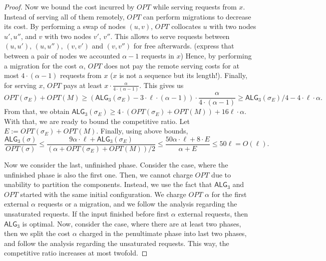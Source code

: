 \documentclass[manuscript,screen=true]{acmart}
\newcommand{\OPT}{\mathit{OPT}}
\newcommand{\TAlg}{{\ensuremath{\textsf{ALG}_{3}}}\xspace} %
\begin{document}
\begin{proof}
  Now we bound the cost incurred by $\OPT$ while serving requests from $x$.
  Instead of serving all of them remotely, $\OPT$ can perform migrations to decrease its cost.
  By performing a swap of nodes $(u,v)$, $\OPT$ collocates $u$ with two nodes $u', u''$, and $v$ with two nodes $v'$, $v''$.
  This allows to serve requests between $(u,u')$, $(u,u'')$, $(v,v')$ and $(v,v'')$ for free afterwards.
  (express that between a pair of nodes we accounted $\alpha-1$ requests in $x$)
  Hence, by performing a migration for the cost $\alpha$, $\OPT$ does not pay the remote serving costs for at most $4\cdot (\alpha - 1)$ requests from $x$ ($x$ is not a sequence but its length!).
  Finally, for serving $x$, $\OPT$ pays at least $x \cdot \frac{\alpha}{4\cdot (\alpha-1)}$.
  This gives us
  \begin{equation*}
    \OPT(\sigma_E) + \OPT(M)  \geq (\TAlg(\sigma_E)-3\cdot\ell\cdot(\alpha - 1)) \cdot \frac{\alpha}{4\cdot (\alpha-1)}
    \geq \TAlg(\sigma_E) / 4 - 4\cdot \ell \cdot \alpha.
  \end{equation*}
  From that, we obtain $\TAlg(\sigma_E) \geq 4\cdot(\OPT(\sigma_E)+\OPT(M)) + 16\ell \cdot \alpha$.
  With that, we are ready to bound the competitive ratio.
  Let $E := \OPT(\sigma_E) + \OPT(M)$. Finally, using above bounds,
  \begin{equation*}
    \frac{\TAlg(\sigma)}{\OPT(\sigma)} \leq \frac{9\alpha \cdot \ell + \TAlg(\sigma_E)}{(\alpha + \OPT(\sigma_E) + \OPT(M))/2} \leq \frac{50\alpha\cdot\ell + 8\cdot E}{\alpha + E} \leq 50 \ell = O(\ell).
  \end{equation*}

  \medskip

  Now we consider the last, unfinished phase.
  Consider the case, where the unfinished phase is also the first one.
  Then, we cannot charge $\OPT$ due to unability to partition the components.
  Instead, we use the fact that \TAlg and $\OPT$ started with the same initial configuration.
  We charge $\OPT$ $\alpha$ for the first external $\alpha$ requests or a migration,
  and we follow the analysis regarding the unsaturated requests.
  If the input finished before first $\alpha$ external requests, then \TAlg is optimal.
  Now, consider the case, where there are at least two phases, then we split the cost $\alpha$ charged in the penultimate phase into last two phases, and follow the analysis regarding the unsaturated requests.
  This way, the competitive ratio increases at most twofold.
\end{proof}
\end{document}
